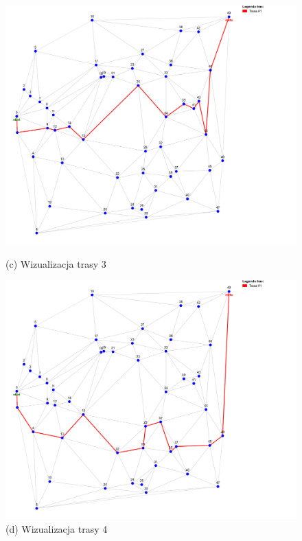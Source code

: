 \documentclass{article}
\begin{document}
\begin{figure}[H]
    \begin{minipage}[b]{0.48\linewidth}
        \includegraphics[width=\linewidth]{3.png}
        \caption*{(c) Wizualizacja trasy 3}
    \end{minipage}
    \hfill
    \begin{minipage}[b]{0.48\linewidth}
        \includegraphics[width=\linewidth]{4.png}
        \caption*{(d) Wizualizacja trasy 4}
    \end{minipage}
    \vspace{0.5em}


\end{figure}
\end{document}
